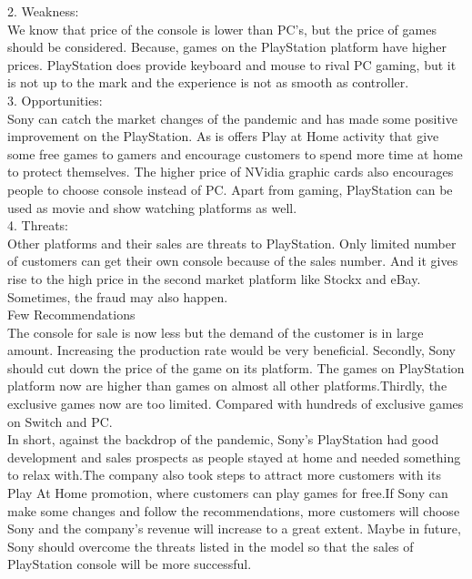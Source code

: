 \documentclass[conference]{IEEEtran}
\begin{document}
2. Weakness:\\
We know that price of the console is lower than PC’s, but the price of games should be considered. Because, games on the PlayStation platform have higher prices. PlayStation does provide keyboard and mouse to rival PC gaming, but it is not up to the mark and the experience is not as smooth as controller.\\
3. Opportunities:\\
Sony can catch the market changes of the pandemic and has made some positive improvement on the PlayStation. As is offers Play at Home activity that give some free games to gamers and encourage customers to spend more time at home to protect themselves. The higher price of NVidia graphic cards also encourages people to choose console instead of PC. Apart from gaming, PlayStation can be used as movie and show watching platforms as well.\\
4. Threats:\\
Other platforms and their sales are threats to PlayStation. Only limited number of customers can get their own console because of the sales number. And it gives rise to the high price in the second market platform like Stockx and eBay. Sometimes, the fraud may also happen.\\
Few Recommendations\\
The console for sale is now less but the demand of the customer is in large amount. Increasing the production rate would be very beneficial. Secondly, Sony should cut down the price of the game on its platform. The games on PlayStation platform now are higher than games on almost all other platforms.Thirdly, the exclusive games now are too limited. Compared with hundreds of exclusive games on Switch and PC.\\
In short, against the backdrop of the pandemic, Sony's PlayStation had good development and sales prospects as people stayed at home and needed something to relax with.The company also took steps to attract more customers with its Play At Home promotion, where customers can play games for free.If Sony can make some changes and follow the recommendations, more customers will choose Sony and the company's revenue will increase to a great extent. Maybe in future, Sony should overcome the threats listed in the model so that the sales of PlayStation console will be more successful.
\end{document}

